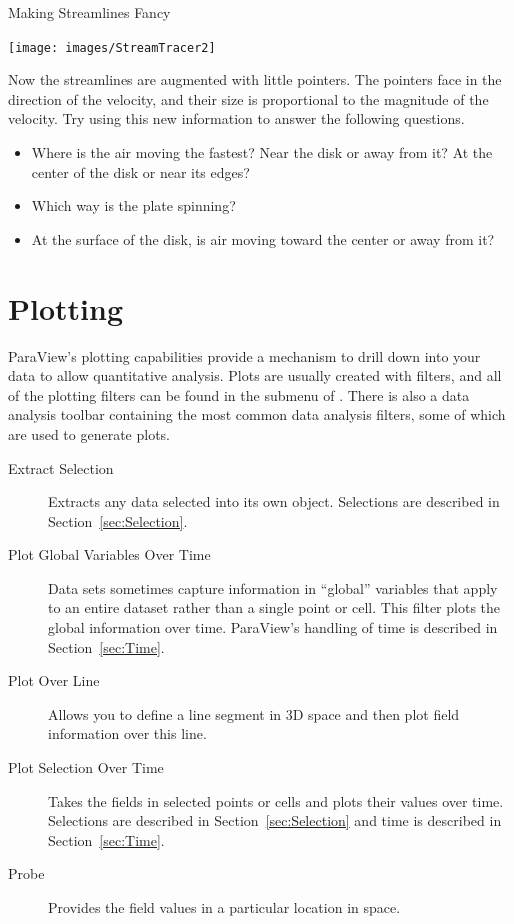 \begin{exercise}{Making Streamlines Fancy}
  \begin{inlinefig}
    \texttt{[image: images/StreamTracer2]}
  \end{inlinefig}

  Now the streamlines are augmented with little pointers.  The pointers
  face in the direction of the velocity, and their size is proportional to
  the magnitude of the velocity.  Try using this new information to answer
  the following questions.

  \begin{itemize}
  \item Where is the air moving the fastest?  Near the disk or away from it?
    At the center of the disk or near its edges?
  \item Which way is the plate spinning?
  \item At the surface of the disk, is air moving toward the center or away
    from it?
  \end{itemize}
\end{exercise}


\section{Plotting}
\label{sec:Plotting}

ParaView's plotting capabilities provide a mechanism to drill down into
your data to allow quantitative analysis.  Plots are usually created with
filters, and all of the plotting filters can be found in the  submenu of .  There is also a data analysis
toolbar containing the most common data analysis filters, some of which are
used to generate plots.


\begin{description}
\item[\extractSelection Extract Selection] Extracts any data selected into
  its own object.  Selections are described in Section~\ref{sec:Selection}.
\item[\plotGlobal Plot Global Variables Over Time] Data sets sometimes
  capture information in ``global'' variables that apply to an entire
  dataset rather than a single point or cell.  This filter plots the global
  information over time.  ParaView's handling of time is described in
  Section~\ref{sec:Time}.
\item[\plotOverLine Plot Over Line] Allows you to define a line segment
  in 3D space and then plot field information over this line.
\item[\plotSelectionOverTime Plot Selection Over Time] Takes the fields in
  selected points or cells and plots their values over time.  Selections
  are described in Section~\ref{sec:Selection} and time is described in
  Section~\ref{sec:Time}.
\item[\probe Probe] Provides the field values in a particular location in
  space.
\end{description}

